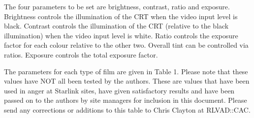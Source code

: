The four parameters to be set are brightness, contrast, ratio and exposure.
Brightness controls the illumination of the CRT when the video input level is
black. Contrast controls the illumination of the CRT (relative to the black
illumination) when the video input level is white. Ratio controls the exposure
factor for each colour relative to the other two. Overall tint can be
controlled via ratios. Exposure controls the total
exposure factor.

The parameters for each type of film are given in Table 1. Please note that
these values have NOT all been tested by the authors. These are values that have
been used in anger at Starlink sites, have given satisfactory results and
have been passed on to the authors by site managers for inclusion in this
document. Please send any corrections or additions to this table to Chris
Clayton at RLVAD::CAC.

